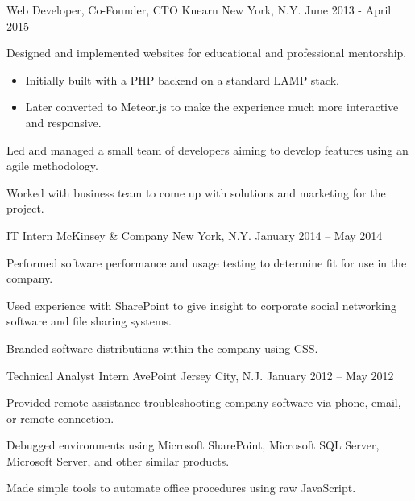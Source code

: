 \begin{cventries}
  \cventry
    {Web Developer, Co-Founder, CTO} %
    {Knearn} %
    {New York, N.Y.} %
    {June 2013 - April 2015} %
    {
      \begin{cvitems} %
        \item {Designed and implemented websites for educational and professional mentorship.}
        \begin{itemize}
          \item {Initially built with a PHP backend on a standard LAMP stack.}
          \item {Later converted to Meteor.js to make the experience much more interactive and responsive.}
        \end{itemize}
        \item {Led and managed a small team of developers aiming to develop features using an agile methodology.}
        \item {Worked with business team to come up with solutions and marketing for the project.}
      \end{cvitems}
    }

  \cventry
    {IT Intern} %
    {McKinsey \& Company} %
    {New York, N.Y.} %
    {January 2014 – May 2014} %
    {
      \begin{cvitems} %
        \item {Performed software performance and usage testing to determine fit for use in the company.}
        \item {Used experience with SharePoint to give insight to corporate social networking software and file sharing systems.}
        \item {Branded software distributions within the company using CSS.}
      \end{cvitems}
    }

  \cventry
    {Technical Analyst Intern} %
    {AvePoint} %
    {Jersey City, N.J.} %
    {January 2012 – May 2012} %
    {
      \begin{cvitems} %
        \item {Provided remote assistance troubleshooting company software via phone, email, or remote connection.}
        \item {Debugged environments using Microsoft SharePoint, Microsoft SQL Server, Microsoft Server, and other similar products.}
        \item {Made simple tools to automate office procedures using raw JavaScript.}
      \end{cvitems}
    }


\end{cventries}
